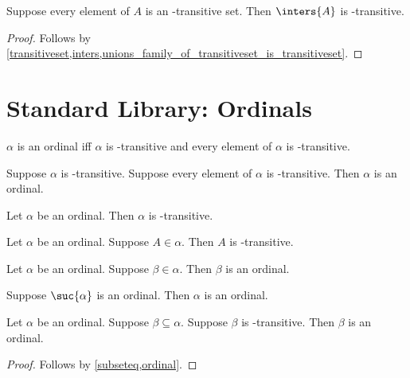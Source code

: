 \begin{proposition}\label{inters_family_of_transitiveset_is_transitiveset}
    Suppose every element of $A$ is an \in-transitive set.
    Then $\inters{A}$ is \in-transitive.
\end{proposition}
\begin{proof}
    Follows by \cref{transitiveset,inters,unions_family_of_transitiveset_is_transitiveset}.
\end{proof}


\section{Standard Library: Ordinals}

\begin{definition}\label{ordinal}
    $\alpha$ is an ordinal iff
    $\alpha$ is \in-transitive and
    every element of $\alpha$ is \in-transitive.
\end{definition}

\begin{proposition}\label{ordinal_intro}
    Suppose $\alpha$ is \in-transitive.
    Suppose every element of $\alpha$ is \in-transitive.
    Then $\alpha$ is an ordinal.
\end{proposition}

\begin{proposition}\label{ordinal_is_transitiveset}
    Let $\alpha$ be an ordinal.
    Then $\alpha$ is \in-transitive.
\end{proposition}

\begin{proposition}\label{ordinal_elem_is_transitiveset}
    Let $\alpha$ be an ordinal.
    Suppose $A\in\alpha$.
    Then $A$ is \in-transitive.
\end{proposition}

\begin{proposition}\label{elem_of_ordinal_is_ordinal}
    Let $\alpha$ be an ordinal.
    Suppose $\beta\in\alpha$.
    Then $\beta$ is an ordinal.
\end{proposition}

\begin{proposition}\label{suc_ordinal_implies_ordinal}
    Suppose $\suc{\alpha}$ is an ordinal.
    Then $\alpha$ is an ordinal.
\end{proposition}

\begin{proposition}\label{transitivesubseteq_of_ordinal_is_ordinal}
    Let $\alpha$ be an ordinal.
    Suppose $\beta\subseteq\alpha$.
    Suppose $\beta$ is \in-transitive.
    Then $\beta$ is an ordinal.
\end{proposition}
\begin{proof}
    Follows by \cref{subseteq,ordinal}.
\end{proof}

